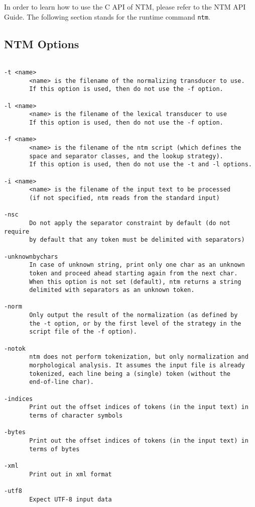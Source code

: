 \documentclass{article}
\newcommand{\comm}[1]{{\tt #1}}
\begin{document}
In order to learn how to use the C API of NTM, please refer to the NTM API Guide. The following section stands for the runtime command \comm{ntm}.

\subsection{NTM Options}

\begin{verbatim}

-t <name>
       <name> is the filename of the normalizing transducer to use.
       If this option is used, then do not use the -f option.

-l <name>
       <name> is the filename of the lexical transducer to use
       If this option is used, then do not use the -f option.

-f <name>
       <name> is the filename of the ntm script (which defines the
       space and separator classes, and the lookup strategy).
       If this option is used, then do not use the -t and -l options.

-i <name>
       <name> is the filename of the input text to be processed
       (if not specified, ntm reads from the standard input)

-nsc
       Do not apply the separator constraint by default (do not require
       by default that any token must be delimited with separators)

-unknownbychars
       In case of unknown string, print only one char as an unknown
       token and proceed ahead starting again from the next char.
       When this option is not set (default), ntm returns a string
       delimited with separators as an unknown token.

-norm
       Only output the result of the normalization (as defined by
       the -t option, or by the first level of the strategy in the
       script file of the -f option).

-notok
       ntm does not perform tokenization, but only normalization and
       morphological analysis. It assumes the input file is already
       tokenized, each line being a (single) token (without the
       end-of-line char).

-indices
       Print out the offset indices of tokens (in the input text) in
       terms of character symbols

-bytes
       Print out the offset indices of tokens (in the input text) in
       terms of bytes

-xml
       Print out in xml format

-utf8
       Expect UTF-8 input data

\end{verbatim}
\end{document}
